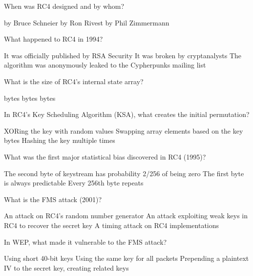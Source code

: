 \documentclass[10pt,a4paper,american]{exam}
\begin{document}
\begin{questions}
	\question When was RC4 designed and by whom?
	\begin{randomizechoices}
		 by Bruce Schneier
		 by Ron Rivest
		 by Phil Zimmermann
	\end{randomizechoices}

	\question What happened to RC4 in 1994?
	\begin{randomizechoices}
		\choice It was officially published by RSA Security
		\choice It was broken by cryptanalysts
		\CorrectChoice The algorithm was anonymously leaked to the Cypherpunks mailing list
	\end{randomizechoices}

	\question What is the size of RC4's internal state array?
	\begin{randomizechoices}
		 bytes
		 bytes
		 bytes
	\end{randomizechoices}

	\question In RC4's Key Scheduling Algorithm (KSA), what creates the initial permutation?
	\begin{randomizechoices}
		\choice XORing the key with random values
		\CorrectChoice Swapping array elements based on the key bytes
		\choice Hashing the key multiple times
	\end{randomizechoices}

	\question What was the first major statistical bias discovered in RC4 (1995)?
	\begin{randomizechoices}
		\CorrectChoice The second byte of keystream has probability 2/256 of being zero
		\choice The first byte is always predictable
		\choice Every 256th byte repeats
	\end{randomizechoices}

	\question What is the FMS attack (2001)?
	\begin{randomizechoices}
		\choice An attack on RC4's random number generator
		\CorrectChoice An attack exploiting weak keys in RC4 to recover the secret key
		\choice A timing attack on RC4 implementations
	\end{randomizechoices}

	\question In WEP, what made it vulnerable to the FMS attack?
	\begin{randomizechoices}
		\choice Using short 40-bit keys
		\choice Using the same key for all packets
		\CorrectChoice Prepending a plaintext IV to the secret key, creating related keys
	\end{randomizechoices}


\end{questions}
\end{document}
